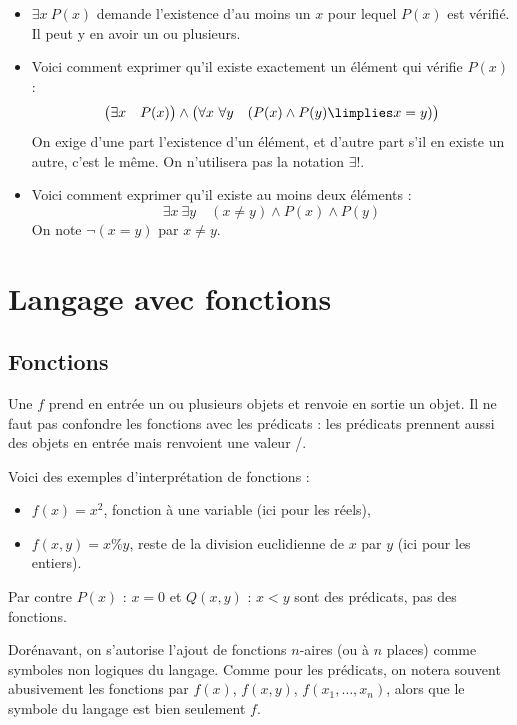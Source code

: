 \documentclass[11pt,class=report,crop=false]{standalone}
\begin{document}
\begin{itemize}
	\item \og{}$\exists x \ P(x)$\fg{} demande l'existence d'au moins un $x$ pour lequel $P(x)$ est vérifié. Il peut y en avoir un ou plusieurs.
	
	\item Voici comment exprimer qu'il existe exactement un élément qui vérifie $P(x)$ :
	\[
	\big( \exists x \quad P(x) \big) \land 
	\big( \forall x \ \forall y \quad (P(x) \land P(y) \limplies x=y) \big)
	\]
	On exige d'une part l'existence d'un élément, et d'autre part s'il en existe un autre, c'est le même.
	On n'utilisera pas la notation \og{}$\exists !$\fg{}.
	
	
	\item Voici comment exprimer qu'il existe au moins deux éléments :
	\[
	\exists x \ \exists y \quad (x \neq y) \land P(x) \land P(y)
	\]
	On note $\lnot (x=y)$ par $x \neq y$.
\end{itemize}



\section{Langage avec fonctions}

\subsection{Fonctions}

Une  $f$ prend en entrée un ou plusieurs objets et renvoie en sortie un objet. Il ne faut pas confondre les fonctions avec les prédicats : les prédicats prennent aussi des objets en entrée mais renvoient une valeur \ltrue/\lfalse.

Voici des exemples d'interprétation de fonctions :
\begin{itemize}
	\item $f(x) = x^2$, fonction à une variable (ici pour les réels),
	
	\item $f(x,y) = x \% y$, reste de la division euclidienne de $x$ par $y$ (ici pour les entiers).
\end{itemize}
Par contre $P(x)$ : \og{}$x=0$\fg{} et $Q(x,y)$ : \og{}$x<y$\fg{} sont des prédicats, pas des fonctions.

Dorénavant, on s'autorise l'ajout de fonctions $n$-aires (ou à $n$ places) comme symboles non logiques du langage.
Comme pour les prédicats, on notera souvent abusivement les fonctions par $f(x)$, $f(x,y)$, $f(x_1,\ldots,x_n)$, alors que le symbole du langage est bien seulement $f$.
\end{document}
